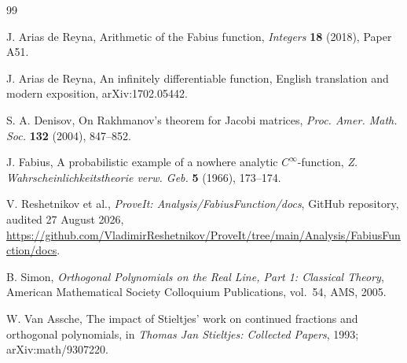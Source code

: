 \documentclass[11pt]{article}
\theoremstyle{definition}
\theoremstyle{remark}
\begin{document}
\begin{thebibliography}{99}

J. Arias de Reyna,
\newblock Arithmetic of the Fabius function,
\newblock \emph{Integers} \textbf{18} (2018), Paper A51.

J. Arias de Reyna,
\newblock An infinitely differentiable function,
\newblock English translation and modern exposition, arXiv:1702.05442.

S. A. Denisov,
\newblock On Rakhmanov's theorem for Jacobi matrices,
\newblock \emph{Proc. Amer. Math. Soc.} \textbf{132} (2004), 847--852.

J. Fabius,
\newblock A probabilistic example of a nowhere analytic \(C^\infty\)-function,
\newblock \emph{Z. Wahrscheinlichkeitstheorie verw. Geb.} \textbf{5} (1966), 173--174.

V. Reshetnikov et al.,
\newblock \emph{ProveIt: Analysis/FabiusFunction/docs},
\newblock GitHub repository, audited 27 August 2026,
\newblock \url{https://github.com/VladimirReshetnikov/ProveIt/tree/main/Analysis/FabiusFunction/docs}.

B. Simon,
\newblock \emph{Orthogonal Polynomials on the Real Line, Part 1: Classical Theory},
\newblock American Mathematical Society Colloquium Publications, vol.~54, AMS, 2005.

W. Van Assche,
\newblock The impact of Stieltjes' work on continued fractions and orthogonal polynomials,
\newblock in \emph{Thomas Jan Stieltjes: Collected Papers}, 1993; arXiv:math/9307220.

\end{thebibliography}
\end{document}
